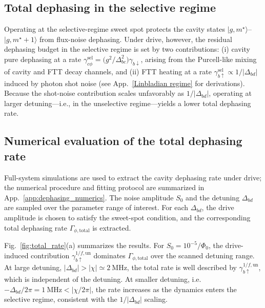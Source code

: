 \subsection{Total dephasing in the selective regime}
\label{subsec:total_dephasing_selective}

Operating at the selective-regime sweet spot protects the cavity states
$\lvert g,m^\star\rangle$--$\lvert g,m^\star\!+\!1\rangle$ from flux-noise dephasing.
Under drive, however, the residual dephasing budget in the selective regime is set by two
contributions: (i) cavity pure dephasing at a rate
$\gamma_{c\phi}^{\mathrm{sel}}=\bigl(g^2/\Delta_{bc}^2\bigr)\gamma_{b\downarrow}$,
arising from the Purcell-like mixing of cavity and FTT decay channels, and
(ii) FTT heating at a rate $\gamma_{b\uparrow}^{\mathrm{sel}}\propto 1/\lvert\Delta_{bd}\rvert$
induced by photon shot noise (see App.~\ref{Linbladian regime} for derivations). Because the shot-noise contribution scales unfavorably as $1/\lvert\Delta_{bd}\rvert$, operating at larger detuning—i.e., in the unselective regime—yields a lower total dephasing rate.

\subsection{Numerical evaluation of the total dephasing rate}
\label{subsec:numerical_total_dephasing_rate}

Full-system simulations are used to extract the cavity dephasing rate under drive; the
numerical procedure and fitting protocol are summarized in App.~\ref{app:dephasing_numerics}.
The noise amplitude $S_0$ and the detuning $\Delta_{bd}$ are sampled over the parameter
range of interest. For each $\Delta_{bd}$, the drive amplitude is chosen to satisfy the
sweet-spot condition, and the corresponding total dephasing rate
$\Gamma_{\phi,\mathrm{total}}$ is extracted.

Fig.~\ref{fig:total_rate}(a) summarizes the results. For $S_0=10^{-5}/\Phi_0$, the
drive-induced contribution $\gamma_{b\uparrow}^{1/f,\mathrm{un}}$ dominates
$\Gamma_{\phi,\mathrm{total}}$ over the scanned detuning range. At large detuning,
$\lvert\Delta_{bd}\rvert> \lvert\chi\rvert\simeq 2~\mathrm{MHz}$, the total rate is well described by $\gamma_{b\uparrow}^{1/f,\mathrm{un}}$, which is independent of the detuning. At smaller detuning, i.e.\
$-\Delta_{bd}/2\pi=1~\mathrm{MHz}<\lvert\chi/2\pi\rvert$, the rate
increases as the dynamics enters the selective regime, consistent with the
$1/\lvert\Delta_{bd}\rvert$ scaling.

